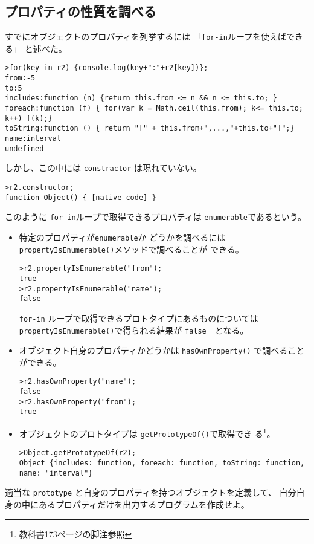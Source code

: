 \subsection{プロパティの性質を調べる}
すでにオブジェクトのプロパティを列挙するには
「\texttt{for-in}ループを使えばできる」
と述べた。
\begin{verbatim}
>for(key in r2) {console.log(key+":"+r2[key])};
from:-5 
to:5 
includes:function (n) {return this.from <= n && n <= this.to; } 
foreach:function (f) { for(var k = Math.ceil(this.from); k<= this.to; k++) f(k);} 
toString:function () { return "[" + this.from+",...,"+this.to+"]";} 
name:interval
undefined
\end{verbatim}
しかし、この中には \texttt{constractor} は現れていない。
\begin{verbatim}
>r2.constructor;
function Object() { [native code] }
\end{verbatim}
このように \texttt{for-in}ループで取得できるプロパティは
\texttt{enumerable}であるという。
\begin{itemize}
 \item 特定のプロパティが\texttt{enumerable}か
どうかを調べるには\texttt{propertyIsEnumerable()}メソッドで調べることが
できる。
\begin{verbatim}
>r2.propertyIsEnumerable("from");
true
>r2.propertyIsEnumerable("name");
false
\end{verbatim}
\texttt{for-in} ループで取得できるプロトタイプにあるものについては
       \texttt{propertyIsEnumerable()}で得られる結果が \texttt{false}　となる。
 \item オブジェクト自身のプロパティかどうかは \texttt{hasOwnProperty()}
       で調べることができる。
\begin{verbatim}
>r2.hasOwnProperty("name");
false
>r2.hasOwnProperty("from");
true
\end{verbatim}
 \item オブジェクトのプロトタイプは \texttt{getPrototypeOf()}で取得でき
       る\footnote{教科書173ページの脚注参照}。
\begin{verbatim}
>Object.getPrototypeOf(r2);
Object {includes: function, foreach: function, toString: function, 
name: "interval"}
\end{verbatim}
\end{itemize}
\begin{Prob}\upshape
適当な \texttt{prototype} と自身のプロパティを持つオブジェクトを定義して、
 自分自身の中にあるプロパティだけを出力するプログラムを作成せよ。
\end{Prob}
